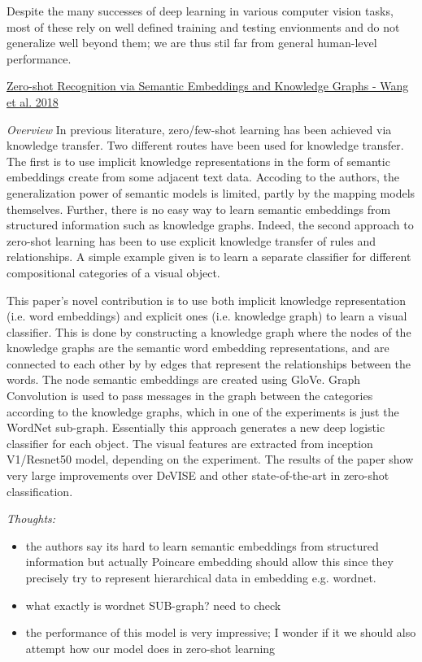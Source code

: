 \documentclass[12pt]{report}
\begin{document}
Despite the many successes of deep learning in various computer vision tasks, most of these rely on well defined training and testing envionments and do not generalize well beyond them; we are thus stil far from general human-level performance.

\newpage
\underline{Zero-shot Recognition via Semantic Embeddings and Knowledge Graphs - Wang et al. 2018}

\textit{Overview}
In previous literature, zero/few-shot learning has been achieved via knowledge transfer. Two different routes have been used for knowledge transfer. The first is to use implicit knowledge representations in the form of semantic embeddings create from some adjacent text data. Accoding to the authors, the generalization power of semantic models is limited, partly by the mapping models themselves. Further, there is no easy way to learn semantic embeddings from structured information such as knowledge graphs. Indeed, the second approach to zero-shot learning has been to use explicit knowledge transfer of rules and relationships. A simple example given is to learn a separate classifier for different compositional categories of a visual object.

This paper's novel contribution is to use both implicit knowledge representation (i.e. word embeddings) and explicit ones (i.e. knowledge graph) to learn a visual classifier. This is done by constructing a knowledge graph where the nodes of the knowledge graphs are the semantic word embedding representations, and are connected to each other by by edges that represent the relationships between the words. The node semantic embeddings are created using GloVe. Graph Convolution is used to pass messages in the graph between the categories according to the knowledge graphs, which in one of the experiments is just the WordNet sub-graph. Essentially this approach generates a new deep logistic classifier for each object. The visual features are extracted from inception V1/Resnet50 model, depending on the experiment. The results of the paper show very large improvements over DeVISE and other state-of-the-art in zero-shot classification. 

\textit{Thoughts:}

\begin{itemize}
\item the authors say its hard to learn semantic embeddings from structured information but actually Poincare embedding should allow this since they precisely try to represent hierarchical data in embedding e.g. wordnet.
\item what exactly is wordnet SUB-graph? need to check
\item the performance of this model is very impressive; I wonder if it we should also attempt how our model does in zero-shot learning
\end{itemize}
\end{document}
